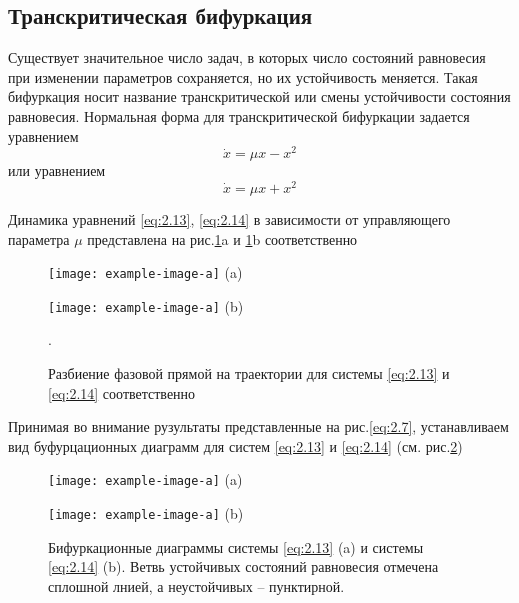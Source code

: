 \subsection{Транскритическая бифуркация} %

Существует значительное число задач, в которых число состояний
равновесия при изменении параметров сохраняется, но их устойчивость
меняется. Такая бифуркация носит название транскритической или смены
устойчивости состояния равновесия. Нормальная форма для транскритической
бифуркации задается уравнением
\begin{equation}
	\label{eq:2.13}
	\dot x = \mu x -x^2
\end{equation}
или уравнением 
\begin{equation}
	\label{eq:2.14}
	\dot x = \mu x+ x^2	
\end{equation}

Динамика уравнений \eqref{eq:2.13}, \eqref{eq:2.14} в зависимости от управляющего параметра $\mu$ представлена на рис.\ref{fig:2.7}a и \ref{fig:2.7}b соответственно

\begin{figure}[h!]
	\centering
	\begin{minipage}{0.49\linewidth}
		\centering
		\texttt{[image: example-image-a]}
		(a)
		\label{fig:2_7a}
	\end{minipage}
	\hfill
	\begin{minipage}{0.49\linewidth}
		\centering
		\texttt{[image: example-image-a]}
		(b)
		\label{fig:2_7b}
	\end{minipage}
	\caption{Разбиение фазовой прямой на траектории для системы \eqref{eq:2.13} и \eqref{eq:2.14} соответственно}.
	\label{fig:2.7}
	
\end{figure}

Принимая во внимание рузультаты представленные на рис.\ref{eq:2.7}, устанавливаем вид буфурцационных диаграмм для систем \eqref{eq:2.13} и \eqref{eq:2.14} (см. рис.\ref{fig:2.8})  
\begin{figure}[h!]
	\centering
	\begin{minipage}{0.49\linewidth}
		\centering
		\texttt{[image: example-image-a]}
		(a)
		\label{fig:2_8a}
	\end{minipage}
	\hfill
	\begin{minipage}{0.49\linewidth}
		\centering
		\texttt{[image: example-image-a]}
		(b)
		\label{fig:2_8b}
	\end{minipage}
	\caption{Бифуркационные диаграммы системы \eqref{eq:2.13} (a) и системы \eqref{eq:2.14} (b). Ветвь устойчивых состояний равновесия отмечена сплошной лнией, а неустойчивых -- пунктирной.}
	\label{fig:2.8}
	
\end{figure}


